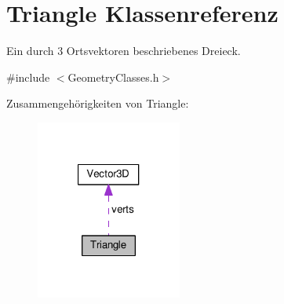 \hypertarget{classTriangle}{\section{Triangle Klassenreferenz}
\label{classTriangle}
}


Ein durch 3 Ortsvektoren beschriebenes Dreieck.  




{\ttfamily \#include $<$Geometry\-Classes.\-h$>$}



Zusammengehörigkeiten von Triangle\-:
\nopagebreak
\begin{figure}[H]
\begin{center}
\leavevmode
\includegraphics[width=136pt]{classTriangle__coll__graph}
\end{center}
\end{figure}
